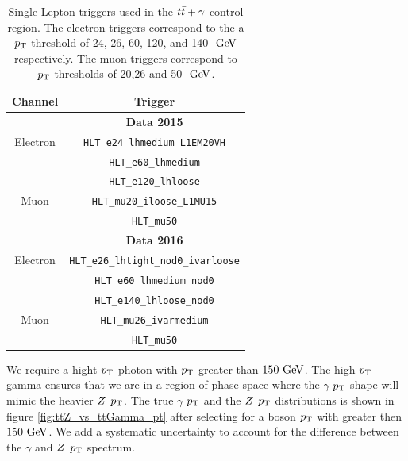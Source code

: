 \begin{table}[h!]
  \begin{center}
    \begin{tabular}{c|c} \hline\hline
      Channel & Trigger \\  \hline
              & {\bf Data 2015} \\ \hline
      Electron & \verb+HLT_e24_lhmedium_L1EM20VH+  \\
      	            & \verb+HLT_e60_lhmedium+ \\
	            & \verb+HLT_e120_lhloose+         \\  
      Muon & \verb+HLT_mu20_iloose_L1MU15+ \\
      	       & \verb+HLT_mu50+ \\
      \hline
              & {\bf Data 2016} \\ \hline
      Electron & \verb+HLT_e26_lhtight_nod0_ivarloose+ \\
                     &\verb+HLT_e60_lhmedium_nod0+ \\
                     &\verb+HLT_e140_lhloose_nod0+         \\ 
      Muon & \verb+HLT_mu26_ivarmedium+ \\ 
                & \verb+HLT_mu50+ \\
      \hline \hline
    \end{tabular}
  \end{center}
  \caption{Single Lepton triggers used in the $t\bar{t}+\gamma$ control region.  The electron triggers correspond to the a $p_{\mathrm{T}}$ threshold of 24, 26, 60, 120, and 140 $\gev$ respectively.  The muon triggers correspond to $p_{\mathrm{T}}$ thresholds of 20,26 and 50 $\gev$. }
  \label{tb:lepTriggers}
\end{table}


\indent We require a hight $p_{\mathrm{T}}$ photon with $p_{\mathrm{T}}$ greater than $150\gev$.  The high $p_{\mathrm{T}}$ gamma ensures that we are in a region of phase space where the $\gamma$ $p_{\mathrm{T}}$ shape will mimic the heavier $Z$ $p_{\mathrm{T}}$.  The true $\gamma$ $p_{\mathrm{T}}$ and the $Z$ $p_{\mathrm{T}}$ distributions is shown in figure \ref{fig:ttZ_vs_ttGamma_pt} after selecting for a boson $p_{\mathrm{T}}$ with greater then $150 \gev$.  We add a systematic uncertainty to account for the difference between the $\gamma$ and $Z$ $p_{\mathrm{T}}$ spectrum. \\

